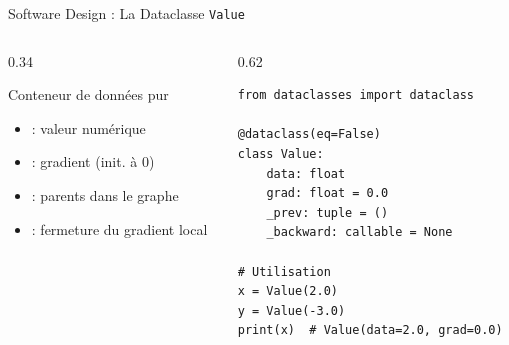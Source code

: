 \documentclass[aspectratio=169, 10pt]{beamer}
\begin{document}
\begin{frame}[fragile]{Software Design : La Dataclasse \texttt{Value}}
  \begin{columns}[T]
    \begin{column}{0.34\textwidth}
      \begin{block}{Conteneur de données pur}
        \begin{itemize}\small
          \item {} : valeur numérique
          \item {} : gradient (init. à 0)
          \item {} : parents dans le graphe
          \item {} : fermeture du gradient local
        \end{itemize}
      \end{block}
      \smallskip
    \end{column}
    \begin{column}{0.62\textwidth}
      \begin{lstlisting}[style=pythonstyle]
from dataclasses import dataclass

@dataclass(eq=False)
class Value:
    data: float
    grad: float = 0.0
    _prev: tuple = ()
    _backward: callable = None

# Utilisation
x = Value(2.0)
y = Value(-3.0)
print(x)  # Value(data=2.0, grad=0.0)
      \end{lstlisting}
    \end{column}
  \end{columns}
\end{frame}
\end{document}

